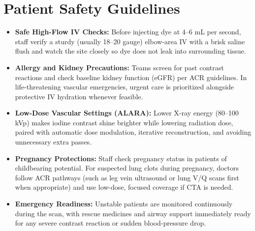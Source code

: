 \section{Patient Safety Guidelines}
\begin{itemize}
    \item \textbf{Safe High-Flow IV Checks:} Before injecting dye at 4--6 mL per second, staff verify a sturdy (usually 18--20 gauge) elbow-area IV with a brisk saline flush and watch the site closely so dye does not leak into surrounding tissue.
    \item \textbf{Allergy and Kidney Precautions:} Teams screen for past contrast reactions and check baseline kidney function (eGFR) per ACR guidelines. In life-threatening vascular emergencies, urgent care is prioritized alongside protective IV hydration whenever feasible.
    \item \textbf{Low-Dose Vascular Settings (ALARA):} Lower X-ray energy (80--100 kVp) makes iodine contrast shine brighter while lowering radiation dose, paired with automatic dose modulation, iterative reconstruction, and avoiding unnecessary extra passes.
    \item \textbf{Pregnancy Protections:} Staff check pregnancy status in patients of childbearing potential. For suspected lung clots during pregnancy, doctors follow ACR pathways (such as leg vein ultrasound or lung V/Q scans first when appropriate) and use low-dose, focused coverage if CTA is needed.
    \item \textbf{Emergency Readiness:} Unstable patients are monitored continuously during the scan, with rescue medicines and airway support immediately ready for any severe contrast reaction or sudden blood-pressure drop.
\end{itemize}


